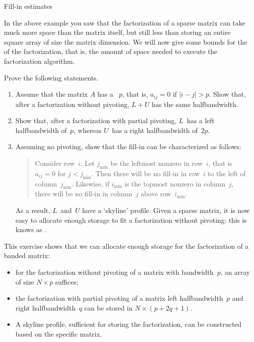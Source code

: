  {Fill-in estimates}
\label{sec:bandfill}

In the above example you saw that the factorization of a sparse matrix
can take much more space than the matrix itself, but still less than
storing an entire square array of size the matrix dimension. We will now give
some bounds for the  of the
factorization, that is, the amount of space needed to execute the
factorization algorithm.

\begin{exercise}
\label{ex:skyline}
  Prove the following statements.
  \begin{enumerate}
  \item Assume that the matrix $A$ has a
    ~$p$, that is, $a_{ij}=0$ if
    $|i-j|>p$. Show that, after a factorization without pivoting,
    $L+U$ has the same halfbandwidth.
  \item Show that, after a factorization with partial pivoting,
    $L$~has a left halfbandwidth of~$p$, whereas $U$~has a
    right halfbandwidth of~$2p$.
  \item Assuming no pivoting, show that the fill-in can be
    characterized as follows:
    \begin{quote}
      Consider row~$i$. Let $j_{\min}$ be the leftmost nonzero in
      row~$i$, that is $a_{ij}=0$ for $j<j_{\min}$. Then there will be
      no fill-in in row~$i$ to the left of
      column~$j_{\min}$. Likewise, if $i_{\min}$ is the topmost
      nonzero in column~$j$, there will be no fill-in in column~$j$
      above row~$i_{\min}$.
    \end{quote}
    As a result, $L$~and~$U$ have a `skyline' profile. Given a sparse
    matrix, it is now easy to allocate enough storage to fit a
    factorization without pivoting: this is knows as
    .
  \end{enumerate}
\end{exercise}

This exercise shows that we can allocate enough storage for the
factorization of a banded matrix:
\begin{itemize}
\item for the factorization without pivoting of a matrix with
  bandwidth~$p$, an array of size $N\times p$ suffices;
\item the factorization with partial pivoting of a matrix left
  halfbandwidth~$p$ and right halfbandwidth~$q$ can be stored in
  $N\times (p+2q+1)$.
\item A skyline profile, sufficient for storing the factorization, can
  be constructed based on the specific matrix.
\end{itemize}

